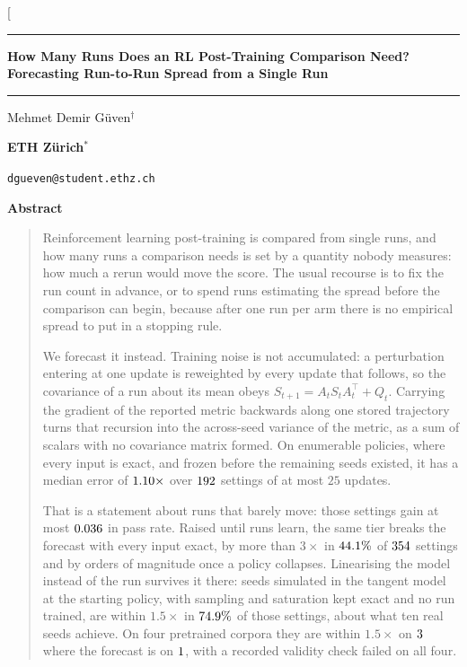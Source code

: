 \documentclass[10pt,twocolumn]{article}
\theoremstyle{definition}
\newcommand{\ruledtitle}[1]{%
  \par\noindent\rule{\textwidth}{1.6pt}\par\vspace{3pt}
  {\centering\fontsize{15}{17}\selectfont\bfseries #1\par}
  \vspace{3pt}\noindent\rule{\textwidth}{0.4pt}\par
}
\begin{document}
\twocolumn[
  \ruledtitle{How Many Runs Does an RL Post-Training Comparison Need?\\
  Forecasting Run-to-Run Spread from a Single Run}
  \vspace{6pt}
  {\centering
    \normalsize Mehmet Demir G\"uven$^{\dagger}$\par\vspace{2pt}
    \normalsize\textbf{ETH Z\"urich}$^{*}$\par\vspace{1pt}
    \small\texttt{dgueven@student.ethz.ch}\par
  }
  \vspace{6pt}
  \begin{minipage}{\textwidth}
  \begin{center}\textbf{Abstract}\end{center}
  \vspace{-4pt}
  \begin{quote}
  Reinforcement learning post-training is compared from single runs, and how many runs a
  comparison needs is set by a quantity nobody measures: how much a rerun would move the score.
  The usual recourse is to fix the run count in advance, or to spend runs estimating the spread
  before the comparison can begin, because after one run per arm there is no empirical spread to
  put in a stopping rule.

  We forecast it instead. Training noise is not accumulated: a perturbation entering at one update
  is reweighted by every update that follows, so the covariance of a run about its mean obeys
  $S_{t+1} = A_t S_t A_t^{\!\top} + Q_t$. Carrying the gradient of the reported metric backwards
  along one stored trajectory turns that recursion into the across-seed variance of the metric, as
  a sum of scalars with no covariance matrix formed. On enumerable policies, where every input is
  exact, and frozen before the remaining seeds existed, it has a median error of
  $1.10\times$ over $192$ settings of at most $25$ updates.

  That is a statement about runs that barely move: those settings gain at most
  $0.036$ in pass rate. Raised until runs learn, the same tier breaks the forecast
  with every input exact, by more than $3\times$ in $44.1\%$ of
  $354$ settings and by orders of magnitude once a policy collapses.
  Linearising the model instead of the run survives it there: seeds simulated in the tangent model
  at the starting policy, with sampling and saturation kept exact and no run trained, are within
  $1.5\times$ in $74.9\%$ of those settings, about what ten real seeds achieve.
  On four pretrained corpora they are within $1.5\times$ on $3$ where the
  forecast is on $1$, with a recorded validity check failed on all four.


\end{quote}
\end{minipage}
\end{document}
